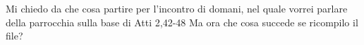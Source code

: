 \author{Daniele Gianotti}

Mi chiedo da che cosa partire per l’incontro di domani, nel quale vorrei parlare della parrocchia sulla base di Atti 2,42-48
Ma ora che cosa succede se ricompilo il file?
